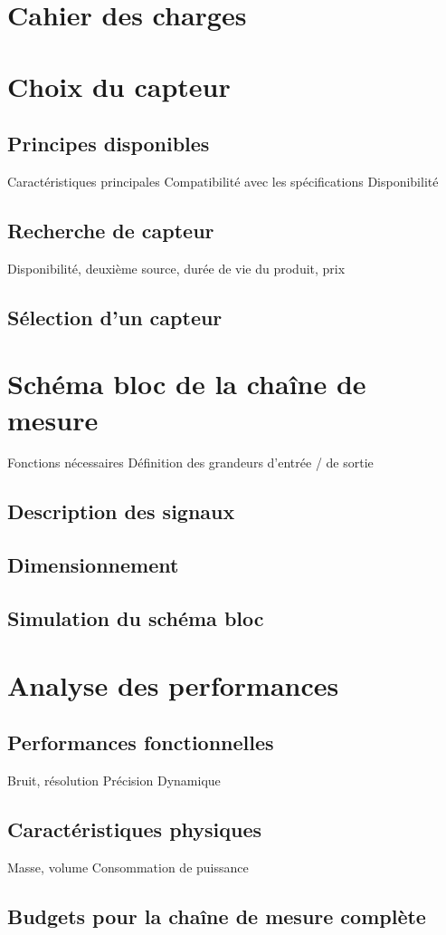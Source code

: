 \section{Cahier des charges}

\section{Choix du capteur}
\subsection{Principes disponibles}
Caractéristiques principales
Compatibilité avec les spécifications
Disponibilité
\subsection{Recherche de capteur}
Disponibilité, deuxième source, durée de vie du
produit, prix
\subsection{Sélection d'un capteur}

\section{Schéma bloc de la chaîne de mesure}
Fonctions nécessaires
Définition des grandeurs d’entrée / de sortie
\subsection{Description des signaux}

\subsection{Dimensionnement}

\subsection{Simulation du schéma bloc}

\section{Analyse des performances}
\subsection{Performances fonctionnelles}
Bruit, résolution
Précision
Dynamique
\subsection{Caractéristiques physiques}
Masse, volume
Consommation de puissance
\subsection{Budgets pour la chaîne de mesure complète}
